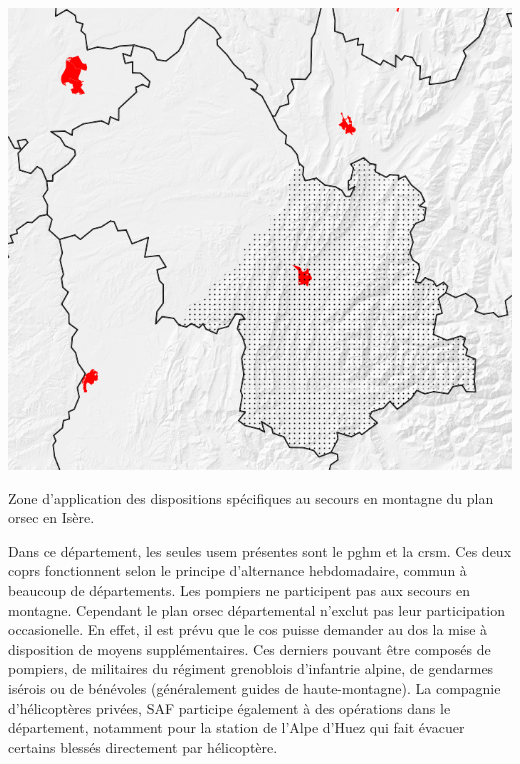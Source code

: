 \begin{carte}
  \centering
  \includegraphics{../figures/Out1.png}
  \caption{Zone d'application des dispositions spécifiques au secours
    en montagne du plan \ac{orsec} en Isère.}
  \label{crt:isere_pms}
\end{carte}

Dans ce département, les seules \ac{usem} présentes sont le \ac{pghm}
et la \ac{crsm}. Ces deux coprs fonctionnent selon le principe
d'alternance hebdomadaire, commun à beaucoup de départements. Les
pompiers ne participent pas aux secours en montagne. Cependant le plan
\ac{orsec} départemental n’exclut pas leur participation
occasionelle. En effet, il est prévu que le \ac{cos} puisse demander
au \ac{dos} la mise à disposition de moyens supplémentaires. Ces
derniers pouvant être composés de pompiers, de militaires du régiment
grenoblois d'infantrie alpine, de gendarmes isérois ou de bénévoles
(généralement guides de haute-montagne).
La compagnie d'hélicoptères privées, SAF participe également à des
opérations dans le département, notamment pour la station de l'Alpe
d'Huez qui fait évacuer certains blessés directement par hélicoptère.

